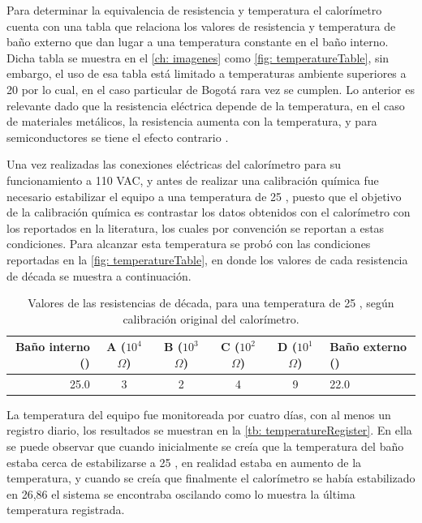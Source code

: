 	Para determinar la equivalencia de resistencia y temperatura el calorímetro cuenta con una tabla que relaciona los valores de resistencia y temperatura de ba\~no externo que dan lugar a una temperatura constante en el ba\~no interno. Dicha tabla se muestra en el \autoref{ch: imagenes} como \autoref{fig: temperatureTable}, sin embargo, el uso de esa tabla est\'a limitado a temperaturas ambiente superiores a 20 \grad{} por lo cual, en el caso particular de Bogot\'a rara vez se cumplen. Lo anterior es relevante dado que la resistencia el\'ectrica depende de la temperatura, en el caso de materiales met\'alicos, la resistencia aumenta con la temperatura, y para semiconductores se tiene el efecto contrario \cite{simon2013oxford}.
	
	Una vez realizadas las conexiones el\'ectricas del calor\'imetro para su funcionamiento a 110 VAC, y antes de realizar una calibraci\'on qu\'imica fue necesario estabilizar el equipo a una temperatura de 25 \grad{}, puesto que el objetivo de la calibraci\'on qu\'imica es contrastar los datos obtenidos con el calor\'imetro con los reportados en la literatura, los cuales por convenci\'on se reportan a estas condiciones. Para alcanzar esta temperatura se probó con las condiciones reportadas en la \autoref{fig: temperatureTable}, en donde los valores de cada resistencia de década se muestra a continuación. 
	\begin{table}[h]
		\centering
		\caption{Valores de las resistencias de década, para una temperatura de 25 \grad{}, seg\'un calibración original del calorímetro.}
		\begin{tabular}{r|cccc|l}
			\hline
			\textbf{Baño interno (\grad{})} & A ($10^4$ $\Omega$) & B ($10^3$ $\Omega$) & C ($10^2$ $\Omega$) & D ($10^1$ $\Omega$) & \textbf{Baño externo (\grad{})} \\
			\hline
			25.0 & 3 & 2 & 4 & 9 & 22.0 \\
			\hline
		\end{tabular}
		\label{tb: decadeResistorsBefore}
	\end{table}
	
	La temperatura del equipo fue monitoreada por cuatro días, con al menos un registro diario, los resultados se muestran en la \autoref{tb: temperatureRegister}. En ella se puede observar que cuando inicialmente se creía que la temperatura del baño estaba cerca de estabilizarse a 25 \grad{}, en realidad estaba en aumento de la temperatura, y cuando se creía que finalmente el calorímetro se había estabilizado en 26,86 \grad{} el sistema se encontraba oscilando como lo muestra la última temperatura registrada.
	

